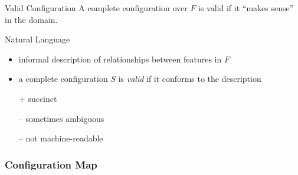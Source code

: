 \begin{frame}{\myframetitle}\label{frame:natlang}
	\begin{fancycolumns}
		\begin{note}{Valid Configuration}
			A complete configuration over $F$ is valid if it ``makes sense'' in the domain.
			\emph{\color{lecturered}{$\leadsto$ ``makes sense''?}}
		\end{note}

		\begin{definition}{Natural Language}
			\begin{itemize}
				\item informal description of relationships between features in $F$
				\item a complete configuration $S$ is \emph{valid} if it conforms to the description
				\item[+] succinct
				\item[--] sometimes ambiguous
				\item[--] not machine-readable
			\end{itemize}
		\end{definition}
	\nextcolumn
	\end{fancycolumns}
\end{frame}

\subsubsection{Configuration Map}

